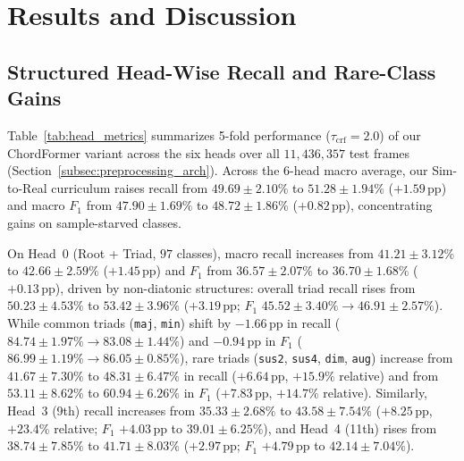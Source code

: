 \section{Results and Discussion}\label{sec:results}

\subsection{Structured Head-Wise Recall and Rare-Class Gains}\label{subsec:head_wise_results}

Table~\ref{tab:head_metrics} summarizes 5-fold performance ($\tau_{\text{crf}} = 2.0$) of our ChordFormer variant across the six heads over all $11{,}436{,}357$ test frames (Section~\ref{subsec:preprocessing_arch}). Across the 6-head macro average, our Sim-to-Real curriculum raises recall from $49.69 \pm 2.10\%$ to $51.28 \pm 1.94\%$ ($+1.59\,\text{pp}$) and macro $F_1$ from $47.90 \pm 1.69\%$ to $48.72 \pm 1.86\%$ ($+0.82\,\text{pp}$), concentrating gains on sample-starved classes.

On Head~0 (Root + Triad, $97$ classes), macro recall increases from $41.21 \pm 3.12\%$ to $42.66 \pm 2.59\%$ ($+1.45\,\text{pp}$) and $F_1$ from $36.57 \pm 2.07\%$ to $36.70 \pm 1.68\%$ ($+0.13\,\text{pp}$), driven by non-diatonic structures: overall triad recall rises from $50.23 \pm 4.53\%$ to $53.42 \pm 3.96\%$ ($+3.19\,\text{pp}$; $F_1$ $45.52 \pm 3.40\% \!\to\! 46.91 \pm 2.57\%$). While common triads ({\small\texttt{maj}}, {\small\texttt{min}}) shift by $-1.66\,\text{pp}$ in recall ($84.74 \pm 1.97\% \!\to\! 83.08 \pm 1.44\%$) and $-0.94\,\text{pp}$ in $F_1$ ($86.99 \pm 1.19\% \!\to\! 86.05 \pm 0.85\%$), rare triads ({\small\texttt{sus2}}, {\small\texttt{sus4}}, {\small\texttt{dim}}, {\small\texttt{aug}}) increase from $41.67 \pm 7.30\%$ to $48.31 \pm 6.47\%$ in recall ($+6.64\,\text{pp}$, $+15.9\%$ relative) and from $53.11 \pm 8.62\%$ to $60.94 \pm 6.26\%$ in $F_1$ ($+7.83\,\text{pp}$, $+14.7\%$ relative). Similarly, Head~3 (9th) recall increases from $35.33 \pm 2.68\%$ to $43.58 \pm 7.54\%$ ($+8.25\,\text{pp}$, $+23.4\%$ relative; $F_1$ $+4.03\,\text{pp}$ to $39.01 \pm 6.25\%$), and Head~4 (11th) rises from $38.74 \pm 7.85\%$ to $41.71 \pm 8.03\%$ ($+2.97\,\text{pp}$; $F_1$ $+4.79\,\text{pp}$ to $42.14 \pm 7.04\%$).

